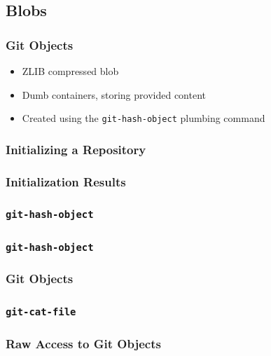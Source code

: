 \documentclass{beamer}
\begin{document}
\subsection{Blobs}
\begin{frame}
\frametitle{Git Objects}
\begin{itemize}
\item{ZLIB compressed blob}
\item{Dumb containers, storing provided content}
\item{Created using the \texttt{git-hash-object} plumbing command}
\end{itemize}
\end{frame}

\begin{frame}[fragile]
\frametitle{Initializing a Repository}

\end{frame}

\begin{frame}[fragile]
\frametitle{Initialization Results}

\end{frame}

\begin{frame}[fragile]
\frametitle{\texttt{git-hash-object}}

\end{frame}

\begin{frame}[fragile]
\frametitle{\texttt{git-hash-object}}

\end{frame}

\begin{frame}
\frametitle{Git Objects}
\begin{figure}
\end{figure}
\end{frame}


\begin{frame}[fragile]
\frametitle{\texttt{git-cat-file}}

\end{frame}

\begin{frame}[fragile]
\frametitle{Raw Access to Git Objects}

\end{frame}
\end{document}

